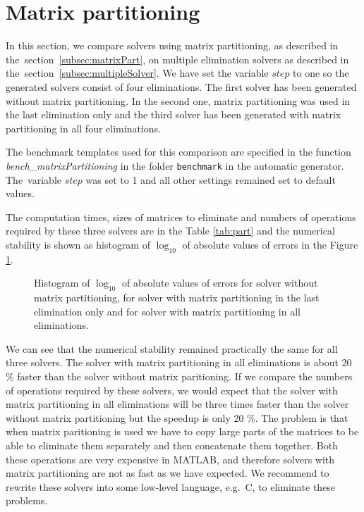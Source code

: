 \section{Matrix partitioning}
\label{exp:part}
In this section, we compare solvers using matrix partitioning, as described in the~section~\ref{subsec:matrixPart}, on multiple elimination solvers as described in the~section~\ref{subsec:multipleSolver}. We have set the variable $step$ to one so the generated solvers consist of four eliminations. The first solver has been generated without matrix partitioning. In the second one, matrix partitioning was used in the last elimination only and the third solver has been generated with matrix partitioning in all four eliminations.

The benchmark templates used for this comparison are specified in the function \textit{bench\_\-mat\-rix\-Partitioning} in the folder \texttt{benchmark} in the automatic generator. The~variable $step$ was set to 1 and all other settings remained set to default values.

The computation times, sizes of matrices to eliminate and numbers of operations required by these three solvers are in the Table \ref{tab:part} and the numerical stability is shown as histogram of $\log_{10}$ of absolute values of errors in the Figure \ref{graph:part}.

\begin{figure}[ht]
  \centering
  \resizebox{0.95\textwidth}{!}{}
  \caption{Histogram of $\log_{10}$ of absolute values of errors for solver without matrix partitioning, for solver with matrix partitioning in the last elimination only and for solver with matrix partitioning in all eliminations.}
  \label{graph:part}
\end{figure}

We can see that the numerical stability remained practically the same for all three solvers. The solver with matrix partitioning in all eliminations is about 20 \% faster than the solver without matrix paritioning. If we compare the numbers of operations required by these solvers, we would expect that the solver with matrix partitioning in all eliminations will be three times faster than the solver without matrix partitioning but the speedup is only 20 \%. The problem is that when matrix paritioning is used we have to copy large parts of the matrices to be able to eliminate them separately and then concatenate them together. Both these operations are very expensive in MATLAB, and therefore solvers with matrix partitioning are not as fast as we have expected. We recommend to rewrite these solvers into some low-level language, e.g.\ C, to eliminate these problems.

